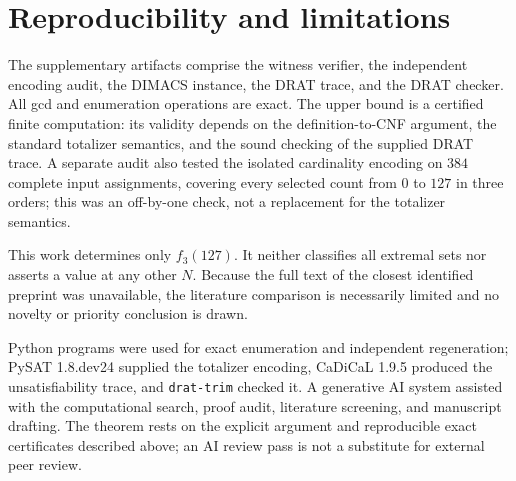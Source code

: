 \documentclass[11pt]{article}
\begin{document}
\section{Reproducibility and limitations}

The supplementary artifacts comprise the witness verifier, the independent
encoding audit, the DIMACS instance, the DRAT trace, and the DRAT checker.
All gcd and enumeration operations are exact.  The upper bound is a certified
finite computation: its validity depends on the definition-to-CNF argument,
the standard totalizer semantics, and the sound checking of the supplied DRAT
trace.  A separate audit also tested the isolated cardinality encoding on
$384$ complete input assignments, covering every selected count from $0$ to
$127$ in three orders; this was an off-by-one check, not a replacement for
the totalizer semantics.

This work determines only $f_3(127)$.  It neither classifies all extremal sets
nor asserts a value at any other $N$.  Because the full text of the closest
identified preprint was unavailable, the literature comparison is necessarily
limited and no novelty or priority conclusion is drawn.

Python programs were used for exact enumeration and independent regeneration;
PySAT 1.8.dev24 supplied the totalizer encoding, CaDiCaL 1.9.5 produced the
unsatisfiability trace, and \texttt{drat-trim} checked it.  A generative AI
system assisted with the computational search, proof audit, literature
screening, and manuscript drafting.  The theorem rests on the explicit
argument and reproducible exact certificates described above; an AI review
pass is not a substitute for external peer review.



\end{document}
